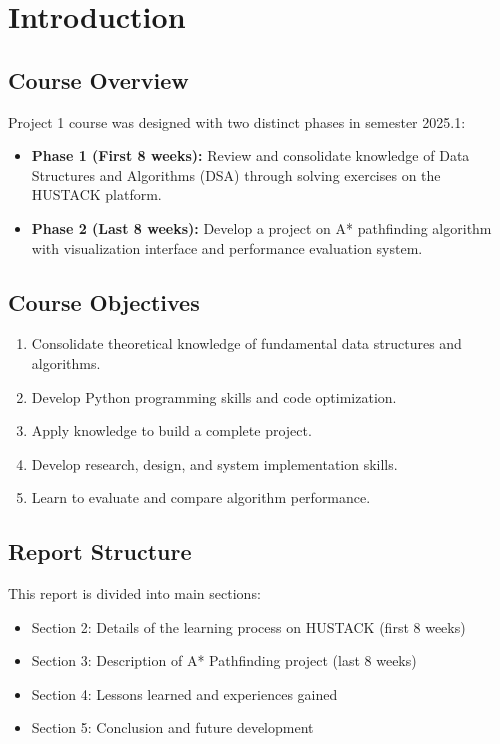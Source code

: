 \documentclass[12pt,a4paper]{article}
\begin{document}
\section{Introduction}

\subsection{Course Overview}
Project 1 course was designed with two distinct phases in semester 2025.1:

\begin{itemize}
    \item \textbf{Phase 1 (First 8 weeks):} Review and consolidate knowledge of Data Structures and Algorithms (DSA) through solving exercises on the HUSTACK platform.
    \item \textbf{Phase 2 (Last 8 weeks):} Develop a project on A* pathfinding algorithm with visualization interface and performance evaluation system.
\end{itemize}

\subsection{Course Objectives}
\begin{enumerate}
    \item Consolidate theoretical knowledge of fundamental data structures and algorithms.
    \item Develop Python programming skills and code optimization.
    \item Apply knowledge to build a complete project.
    \item Develop research, design, and system implementation skills.
    \item Learn to evaluate and compare algorithm performance.
\end{enumerate}

\subsection{Report Structure}
This report is divided into main sections:
\begin{itemize}
    \item Section 2: Details of the learning process on HUSTACK (first 8 weeks)
    \item Section 3: Description of A* Pathfinding project (last 8 weeks)
    \item Section 4: Lessons learned and experiences gained
    \item Section 5: Conclusion and future development
\end{itemize}
\end{document}
